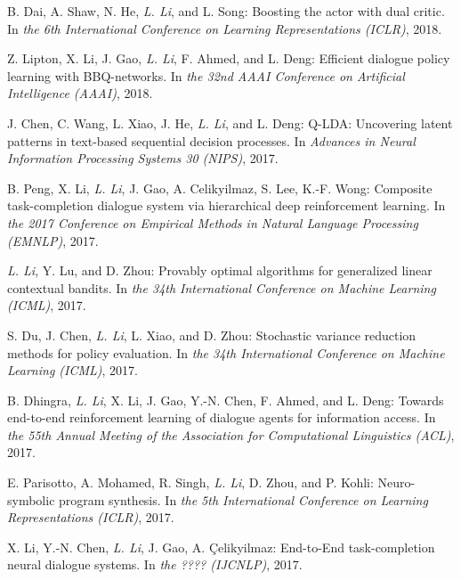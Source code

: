 \documentclass[10pt,twoside,letterpaper]{article}
\newcommand{\selffont}[1]{{\textit{#1}}}
\newcommand{\venuefont}[1]{{\textit{#1}}}
\newcommand{\myself}{\selffont{L. Li}}
\begin{document}
\begin{compactenum}[(C1)]

\item{B. Dai, A. Shaw, N. He, \myself, and L. Song: Boosting the actor with dual critic. In \venuefont{the 6th International Conference on Learning Representations (ICLR)}, 2018.}

\item{Z. Lipton, X. Li, J. Gao, \myself, F. Ahmed, and L. Deng: Efficient dialogue policy learning with BBQ-networks.  In \venuefont{the 32nd AAAI Conference on Artificial Intelligence (AAAI)}, 2018.}

\item{J. Chen, C. Wang, L. Xiao, J. He, \myself, and L. Deng: Q-LDA: Uncovering latent patterns in text-based sequential decision processes. In \venuefont{Advances in Neural Information Processing Systems 30 (NIPS)}, 2017.}

\item{B. Peng, X. Li, \myself, J. Gao, A. Celikyilmaz, S. Lee, K.-F. Wong: Composite task-completion dialogue system via hierarchical deep reinforcement learning.  In \venuefont{the 2017 Conference on Empirical Methods in Natural Language Processing (EMNLP)}, 2017.}

\item{\myself, Y. Lu, and D. Zhou: Provably optimal algorithms for generalized linear contextual bandits.  In \venuefont{the 34th International Conference on Machine Learning (ICML)}, 2017.}

\item{S. Du, J. Chen, \myself, L. Xiao, and D. Zhou: Stochastic variance reduction methods for policy evaluation.  In \venuefont{the 34th International Conference on Machine Learning (ICML)}, 2017.}

\item{B. Dhingra, \myself, X. Li, J. Gao, Y.-N. Chen, F. Ahmed, and L. Deng: Towards end-to-end reinforcement learning of dialogue agents for information access.  In \venuefont{the 55th Annual Meeting of the Association for Computational Linguistics (ACL)}, 2017.}

\item{E. Parisotto, A. Mohamed, R. Singh, \myself, D. Zhou, and P. Kohli: Neuro-symbolic program synthesis.  In \venuefont{the 5th International Conference on Learning Representations (ICLR)}, 2017.}

\item{X. Li, Y.-N. Chen, \myself, J. Gao, A. Çelikyilmaz: End-to-End task-completion neural dialogue systems.  In \venuefont{the ???? (IJCNLP)}, 2017.}


\end{compactenum}
\end{document}
